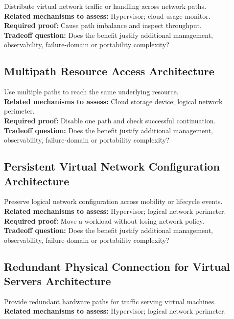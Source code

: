 \documentclass[10pt,letterpaper]{article}
\begin{document}
Distribute virtual network traffic or handling across network paths.\\[3pt]
\textbf{Related mechanisms to assess:} Hypervisor; cloud usage monitor.\\[3pt]
\textbf{Required proof:} Cause path imbalance and inspect throughput.\\[3pt]
\textbf{Tradeoff question:} Does the benefit justify additional management, observability, failure-domain or portability complexity?\\[3pt]
\subsection{Multipath Resource Access Architecture}
Use multiple paths to reach the same underlying resource.\\[3pt]
\textbf{Related mechanisms to assess:} Cloud storage device; logical network perimeter.\\[3pt]
\textbf{Required proof:} Disable one path and check successful continuation.\\[3pt]
\textbf{Tradeoff question:} Does the benefit justify additional management, observability, failure-domain or portability complexity?\\[3pt]
\subsection{Persistent Virtual Network Configuration Architecture}
Preserve logical network configuration across mobility or lifecycle events.\\[3pt]
\textbf{Related mechanisms to assess:} Hypervisor; logical network perimeter.\\[3pt]
\textbf{Required proof:} Move a workload without losing network policy.\\[3pt]
\textbf{Tradeoff question:} Does the benefit justify additional management, observability, failure-domain or portability complexity?\\[3pt]
\subsection{Redundant Physical Connection for Virtual Servers Architecture}
Provide redundant hardware paths for traffic serving virtual machines.\\[3pt]
\textbf{Related mechanisms to assess:} Hypervisor; logical network perimeter.\\[3pt]
\end{document}
